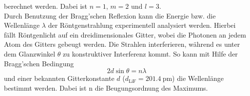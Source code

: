berechnet werden. Dabei ist $n=1$, $m=2$ und $l=3$.
\\
Durch Benutzung der Bragg'schen Reflexion kann die Energie bzw. die Wellenlänge $\lambda$ der Röntgenstrahlung experimentell analysiert werden.
Hierbei fällt Röntgenlicht auf ein dreidimensionales Gitter, wobei die Photonen an jedem Atom des Gitters gebeugt werden. Die Strahlen interferieren, während es unter dem Glanzwinkel $\theta$ 
 zu konstruktiver Interferenz kommt. So kann mit Hilfe der Bragg'schen Bedingung
\begin{equation}
    2 d \sin \theta = n \lambda
    \label{eqn:bragg}
\end{equation}
und einer bekannten Gitterkonstante $d$ ($d_\text{LiF}=\SI{201.4}{\pico \metre}$) die Wellenlänge bestimmt werden. Dabei ist n die Beugungsordnung des Maximums.


